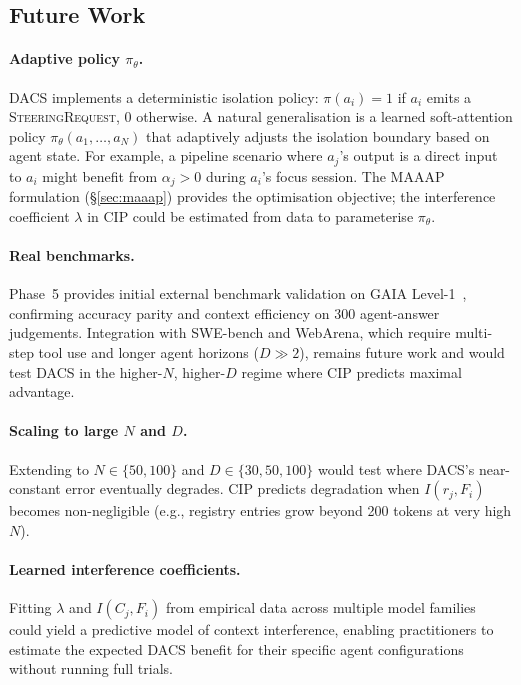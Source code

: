 \documentclass{article}
\begin{document}
\subsection{Future Work}
\label{sec:future}

\paragraph{Adaptive policy $\pi_\theta$.}
DACS implements a deterministic isolation policy: $\pi(a_i) = 1$ if
$a_i$ emits a \textsc{SteeringRequest}, 0 otherwise.
A natural generalisation is a learned soft-attention policy
$\pi_\theta(a_1, \ldots, a_N)$ that adaptively adjusts the isolation
boundary based on agent state.
For example, a pipeline scenario where $a_j$'s output is a direct input
to $a_i$ might benefit from $\alpha_j > 0$ during $a_i$'s focus session.
The MAAAP formulation (\S\ref{sec:maaap}) provides the optimisation
objective; the interference coefficient $\lambda$ in CIP could be
estimated from data to parameterise $\pi_\theta$.

\paragraph{Real benchmarks.}
Phase~5 provides initial external benchmark validation on GAIA
Level-1~\citep{gaia2023}, confirming accuracy parity and context
efficiency on 300 agent-answer judgements.
Integration with SWE-bench and WebArena, which require multi-step
tool use and longer agent horizons ($D \gg 2$), remains future work
and would test DACS in the higher-$N$, higher-$D$ regime where CIP
predicts maximal advantage.

\paragraph{Scaling to large $N$ and $D$.}
Extending to $N \in \{50, 100\}$ and $D \in \{30, 50, 100\}$ would
test where DACS's near-constant error eventually degrades.
CIP predicts degradation when $I(r_j, F_i)$ becomes non-negligible
(e.g., registry entries grow beyond 200 tokens at very high $N$).

\paragraph{Learned interference coefficients.}
Fitting $\lambda$ and $I(C_j, F_i)$ from empirical data across multiple
model families could yield a predictive model of context interference,
enabling practitioners to estimate the expected DACS benefit for their
specific agent configurations without running full trials.
\end{document}
